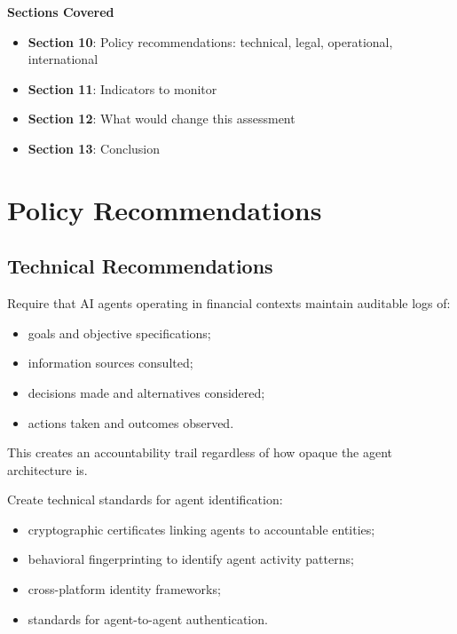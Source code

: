 \documentclass[11pt,letterpaper]{article}
\begin{document}
\begin{center}
\begin{minipage}{0.9\textwidth}
\begin{tcolorbox}[enhanced, colback=white, colframe=emeralddeep!40, boxrule=1pt, arc=4pt,
  left=15pt, right=15pt, top=12pt, bottom=12pt]
\textcolor{forestdark}{\textbf{Sections Covered}}
\vspace{0.4em}
\begin{itemize}[nosep]
  \item \textbf{Section 10}: Policy recommendations: technical, legal, operational, international
  \item \textbf{Section 11}: Indicators to monitor
  \item \textbf{Section 12}: What would change this assessment
  \item \textbf{Section 13}: Conclusion
\end{itemize}
\end{tcolorbox}
\end{minipage}
\end{center}

\vspace{0.8cm}

\section{Policy Recommendations}

\subsection{Technical Recommendations}

\begin{recbox}
Require that AI agents operating in financial contexts maintain auditable logs of:
\begin{itemize}
  \item goals and objective specifications;
  \item information sources consulted;
  \item decisions made and alternatives considered;
  \item actions taken and outcomes observed.
\end{itemize}
This creates an accountability trail regardless of how opaque the agent architecture is.
\end{recbox}

\begin{recbox}
Create technical standards for agent identification:
\begin{itemize}
  \item cryptographic certificates linking agents to accountable entities;
  \item behavioral fingerprinting to identify agent activity patterns;
  \item cross-platform identity frameworks;
  \item standards for agent-to-agent authentication.
\end{itemize}
\end{recbox}
\end{document}

